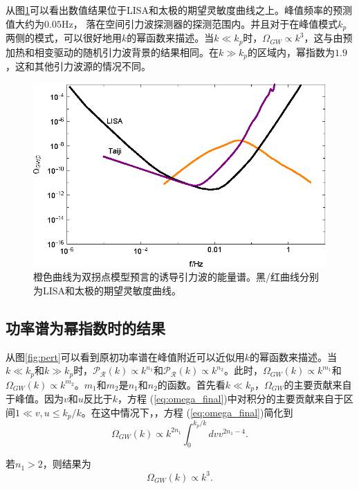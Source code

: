 从图\ref{fig:lisa_taiji}可以看出数值结果位于LISA\citep{amaro2017laser}和太极\citep{guo2018taiji}的期望灵敏度曲线之上。峰值频率的预测值大约为$0.05\text{Hz}$，
落在空间引力波探测器的探测范围内。并且对于在峰值模式$k_p$两侧的模式，可以很好地用$k$的幂函数来描述。当$k\ll
k_p$时，$\Omega_{GW} \propto
k^3$，这与由预加热和相变驱动的随机引力波背景的结果相同。在$k\gg
k_p$的区域内，幂指数为$1.9$，这和其他引力波源的情况不同。

\begin{figure}
    \centering
    \includegraphics{Img/Lisa2.eps}
    \caption{橙色曲线为双拐点模型预言的诱导引力波的能量谱。黑/红曲线分别为LISA\citep{amaro2017laser}和太极\citep{guo2018taiji}的期望灵敏度曲线。}\label{fig:lisa_taiji}
\end{figure}

\subsection{功率谱为幂指数时的结果}
从图\ref{fig:pert}可以看到原初功率谱在峰值附近可以近似用$k$的幂函数来描述。当$k\ll
k_p$和$k\gg k_p$时，$\mathcal{P_R}(k)\propto
k^{n_1}$和$\mathcal{P_R}(k)\propto k^{n_2}$。此时，$\Omega_{GW}(k)\propto
k^{m_1}$和$\Omega_{GW}(k)\propto
k^{m_2}$。$m_1$和$m_2$是$n_1$和$n_2$的函数。首先看$k\ll
k_p$，$\Omega_{GW}$的主要贡献来自于峰值。因为$v$和$u$反比于$k$，方程
(\ref{eq:omega_final})中对积分的主要贡献来自于区间$1\ll v,u\le
k_p/k$。在这中情况下，，方程 (\ref{eq:omega_final})简化到
\begin{equation}
    \Omega_{GW}(k)\propto k^{2n_1}\int_0^{k_p/k} dv v^{2n_1 - 4}. 
\end{equation}

若$n_1 > 2$，则结果为
\begin{equation}
    \Omega_{GW}(k)\propto k^3.
\end{equation}

